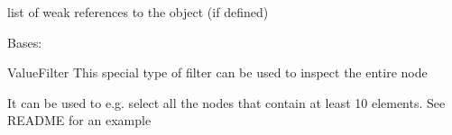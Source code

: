 \documentclass[a4paper,10pt,english]{sphinxmanual}
\begin{document}
\begin{fulllineitems}

\begin{fulllineitems}
\label{\detokenize{fagus.filters:fagus.filters.FilBase.__weakref__}}
\pysigstartsignatures
{}
\pysigstopsignatures
\sphinxAtStartPar
list of weak references to the object (if defined)

\end{fulllineitems}


\end{fulllineitems}


\begin{fulllineitems}
\label{\detokenize{fagus.filters:fagus.filters.VFil}}
\pysigstartsignatures
{}
\pysigstopsignatures
\sphinxAtStartPar
Bases: {\hyperref[\detokenize{fagus.filters:fagus.filters.FilBase}]{}}

\sphinxAtStartPar
ValueFilter \sphinxhyphen{} This special type of filter can be used to inspect the entire node

\sphinxAtStartPar
It can be used to e.g. select all the nodes that contain at least 10 elements. See README for an example


\end{fulllineitems}
\end{document}
